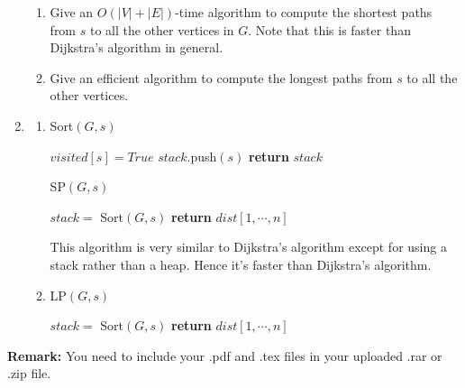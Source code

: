 \documentclass[12pt,a4paper]{article}
\makeatletter
\newtheorem*{solution}{Solution}
\theoremstyle{definition}
\renewenvironment{solution}[1][Solution] {\par\pushQED{\qed}\normalfont\topsep6\p@\@plus6\p@\relax\trivlist\item[\hskip\labelsep\bfseries#1\@addpunct{.}]\ignorespaces}{\popQED\endtrivlist\@endpefalse} \makeatother
\makeatother
\begin{document}
\begin{enumerate}
    \begin{enumerate}
    	\item
    	Give an $O(|V|+|E|)$-time algorithm to compute the shortest paths from $s$ to all the other vertices in $G$. Note that this is faster than Dijkstra's algorithm in general.
    	\item
    	Give an efficient algorithm to compute the longest paths from $s$ to all the other vertices.
    \end{enumerate}
    \begin{solution}
    	\hfill
    	\begin{enumerate}
    		\item 
    		\begin{minipage}[t]{0.9\textwidth}
    			\begin{algorithm}[H]
    				\caption{Sort$(G, s)$}
    				$visited[s] = True$\;
    				$stack$.push$(s)$\;
    				\textbf{return} $stack$\;
    			\end{algorithm}
    			\begin{algorithm}[H]
    				\caption{SP$(G,s)$}
    				$stack =$ Sort$(G, s)$\;
    				\textbf{return} $dist[1, \cdots , n]$\;
    			\end{algorithm}
    		\end{minipage}
    		This algorithm is very similar to Dijkstra's algorithm except for using a stack rather than a heap. Hence it's faster than Dijkstra's algorithm.
    		\item
    		\begin{minipage}[t]{0.9\textwidth}
    			\begin{algorithm}[H]
    				\caption{LP$(G,s)$}
    				$stack =$ Sort$(G, s)$\;
    				\textbf{return} $dist[1, \cdots , n]$\;
    			\end{algorithm}
    		\end{minipage}
    	\end{enumerate}
    \end{solution}
\end{enumerate}

\vspace{20pt}

\textbf{Remark:} You need to include your .pdf and .tex files in your uploaded .rar or .zip file.

\end{document}
